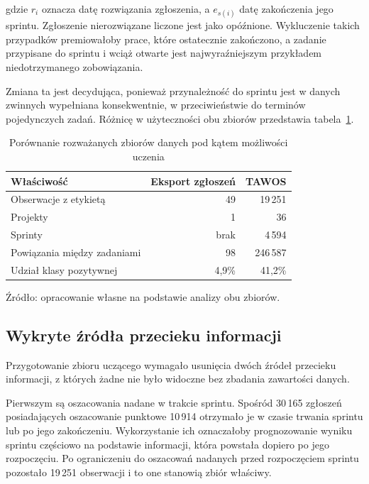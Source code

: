 gdzie \(r_i\) oznacza datę rozwiązania zgłoszenia, a \(e_{s(i)}\) datę zakończenia jego sprintu. Zgłoszenie nierozwiązane liczone jest jako opóźnione. Wykluczenie takich przypadków premiowałoby prace, które ostatecznie zakończono, a zadanie przypisane do sprintu i wciąż otwarte jest najwyraźniejszym przykładem niedotrzymanego zobowiązania.

Zmiana ta jest decydująca, ponieważ przynależność do sprintu jest w danych zwinnych wypełniana konsekwentnie, w przeciwieństwie do terminów pojedynczych zadań. Różnicę w użyteczności obu zbiorów przedstawia tabela~\ref{tab:porownanie-zbiorow}.

\begin{table}[htbp]
    \centering
    \small
    \caption{Porównanie rozważanych zbiorów danych pod kątem możliwości uczenia}
    \label{tab:porownanie-zbiorow}
    \begin{tabularx}{\textwidth}{@{}Xrr@{}}
        \toprule
        \textbf{Właściwość} & \textbf{Eksport zgłoszeń} & \textbf{TAWOS} \\
        \midrule
        Obserwacje z etykietą & 49 & 19\,251 \\
        Projekty & 1 & 36 \\
        Sprinty & brak & 4\,594 \\
        Powiązania między zadaniami & 98 & 246\,587 \\
        Udział klasy pozytywnej & 4,9\% & 41,2\% \\
        \bottomrule
    \end{tabularx}

    \par\smallskip
    \begin{minipage}{\textwidth}
        \footnotesize
        Źródło: opracowanie własne na podstawie analizy obu zbiorów.
    \end{minipage}
\end{table}

\subsection{Wykryte źródła przecieku informacji}

Przygotowanie zbioru uczącego wymagało usunięcia dwóch źródeł przecieku informacji, z których żadne nie było widoczne bez zbadania zawartości danych.

Pierwszym są oszacowania nadane w trakcie sprintu. Spośród 30\,165 zgłoszeń posiadających oszacowanie punktowe 10\,914 otrzymało je w czasie trwania sprintu lub po jego zakończeniu. Wykorzystanie ich oznaczałoby prognozowanie wyniku sprintu częściowo na podstawie informacji, która powstała dopiero po jego rozpoczęciu. Po ograniczeniu do oszacowań nadanych przed rozpoczęciem sprintu pozostało 19\,251 obserwacji i to one stanowią zbiór właściwy.

